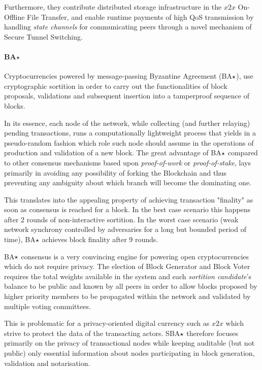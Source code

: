 Furthermore, they contribute distributed storage infrastructure in the $x2x$ On- Offline File Transfer, and enable runtime payments of high QoS transmission by handling \textit{state channels} for communicating peers through a novel mechanism of Secure Tunnel Switching.

\paragraph{BA$\large\star$}

Cryptocurrencies powered by message-passing Byzantine Agreement (BA$\large\star$), use cryptographic sortition in order to carry out the functionalities of block proposals, validations and subsequent insertion into a tamperproof sequence of blocks.

In its essence, each node of the network, while collecting (and further relaying) pending transactions, runs a computationally lightweight process that yields in a pseudo-random fashion which role such node should assume in the operations of production and validation of a new block. The great advantage of BA$\large\star$ compared to other consensus mechanisms based upon \textit{proof-of-work} or \textit{proof-of-stake}, lays primarily in avoiding any possibility of forking the Blockchain and thus preventing any ambiguity about which branch will become the dominating one.

This translates into the appealing property of achieving transaction "finality" as soon as consensus is reached for a block. In the best case scenario this happens after 2 rounds of non-interactive sortition. In the worst case scenario (weak network synchrony controlled by adversaries for a long but  bounded period of time), BA$\large\star$ achieves block finality after 9 rounds.

BA$\large\star$ consensus is a very convincing engine for powering open cryptocurrencies which do not require privacy. The election of Block Generator and Block Voter requires the total weights available in the system and each \textit{sortition candidate}'s balance to be public and known by all peers in order to allow blocks proposed by higher priority members to be propagated within the network and validated by multiple voting committees.

This is problematic for a privacy-oriented digital currency such as $x2x$ which strive to protect the data of the transacting actors. SBA$\large\star$ therefore focuses primarily on the privacy of transactional nodes while keeping auditable (but not public) only essential information about nodes participating in block generation, validation and notarisation.

